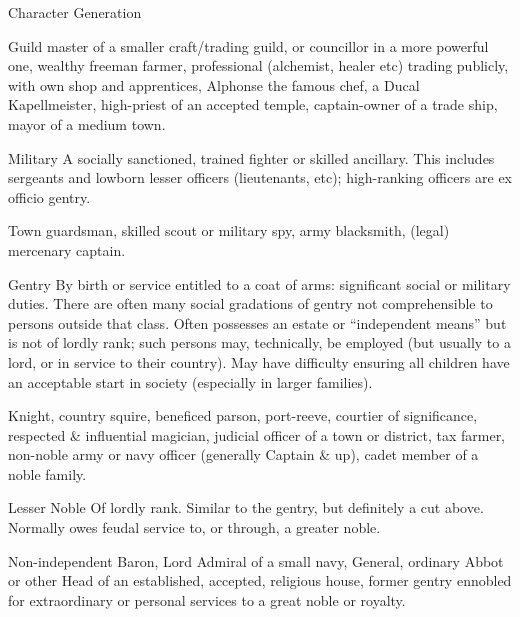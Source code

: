 \begin{Chapter}{Character Generation}
\begin{Description}
  \begin{example} 
    Guild master of a smaller craft/trading guild, or councillor in a
    more powerful one, wealthy freeman farmer, professional
    (alchemist, healer etc) trading publicly, with own shop and
    apprentices, Alphonse the famous chef, a Ducal Kapellmeister,
    high-priest of an accepted temple, captain-owner of a trade ship,
    mayor of a medium town.
  \end{example}
  
\item[Military] A socially sanctioned, trained fighter or skilled
  ancillary.  This includes sergeants and lowborn lesser officers
  (lieutenants, etc); high-ranking officers are ex officio gentry.
  
  \begin{example} 
    Town guardsman, skilled scout or military spy, army blacksmith,
    (legal) mercenary captain.
  \end{example}

\item[Gentry] By birth or service entitled to a coat of arms:
  significant social or military duties.  There are often many social
  gradations of gentry not comprehensible to persons outside that
  class.  Often possesses an estate or “independent means” but is not
  of lordly rank; such persons may, technically, be employed (but
  usually to a lord, or in service to their country).  May have
  difficulty ensuring all children have an acceptable start in society
  (especially in larger families).

  \begin{example}
    Knight, country squire, beneficed parson, port-reeve, courtier of
    significance, respected \& influential magician, judicial officer
    of a town or district, tax farmer, non-noble army or navy officer
    (generally Captain \& up), cadet member of a noble family.
  \end{example}

\item[Lesser Noble] Of lordly rank. Similar to the gentry, but
  definitely a cut above.  Normally owes feudal service to, or
  through, a greater noble.

  \begin{example}
    Non-independent Baron, Lord Admiral of a small navy, General,
    ordinary Abbot or other Head of an established, accepted,
    religious house, former gentry ennobled for extraordinary or
    personal services to a great noble or royalty.
  \end{example}
  

\end{Description}
\end{Chapter}
